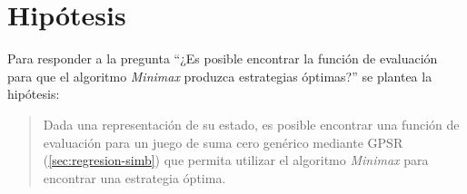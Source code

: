 \section{Hipótesis}
  Para responder a la pregunta \enquote{¿Es posible encontrar la función de evaluación para que el algoritmo 
  \textit{Minimax} produzca estrategias óptimas?} se plantea la hipótesis:
  \begin{quote}
    Dada una representación de su estado, es posible encontrar una función de evaluación para un juego
    de suma cero genérico mediante GPSR (\cref{sec:regresion-simb}) que permita utilizar el algoritmo
    \textit{Minimax} para encontrar una estrategia óptima.  
  \end{quote}
  
